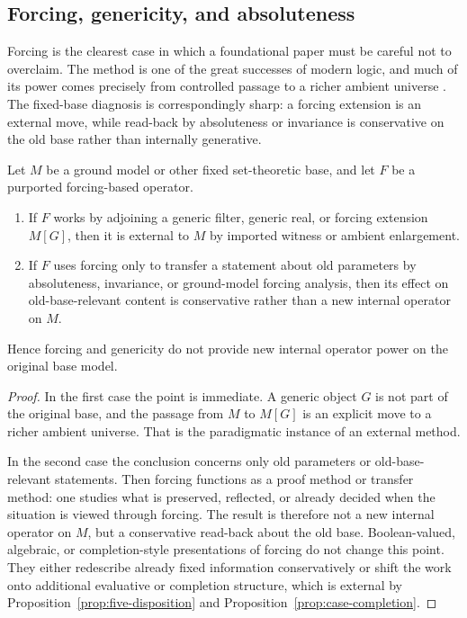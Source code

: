 \subsection{Forcing, genericity, and absoluteness}

Forcing is the clearest case in which a foundational paper must be careful not to overclaim. The method is one of the great successes of modern logic, and much of its power comes precisely from controlled passage to a richer ambient universe \citep{Jech2003,Kanamori2008}. The fixed-base diagnosis is correspondingly sharp: a forcing extension is an external move, while read-back by absoluteness or invariance is conservative on the old base rather than internally generative.

\begin{proposition}\label{prop:case-forcing}
Let $M$ be a ground model or other fixed set-theoretic base, and let $F$ be a purported forcing-based operator.
\begin{enumerate}[label=(\alph*)]
    \item If $F$ works by adjoining a generic filter, generic real, or forcing extension $M[G]$, then it is external to $M$ by imported witness or ambient enlargement.
    \item If $F$ uses forcing only to transfer a statement about old parameters by absoluteness, invariance, or ground-model forcing analysis, then its effect on old-base-relevant content is conservative rather than a new internal operator on $M$.
\end{enumerate}
Hence forcing and genericity do not provide new internal operator power on the original base model.
\end{proposition}

\begin{proof}
In the first case the point is immediate. A generic object $G$ is not part of the original base, and the passage from $M$ to $M[G]$ is an explicit move to a richer ambient universe. That is the paradigmatic instance of an external method.

In the second case the conclusion concerns only old parameters or old-base-relevant statements. Then forcing functions as a proof method or transfer method: one studies what is preserved, reflected, or already decided when the situation is viewed through forcing. The result is therefore not a new internal operator on $M$, but a conservative read-back about the old base. Boolean-valued, algebraic, or completion-style presentations of forcing do not change this point. They either redescribe already fixed information conservatively or shift the work onto additional evaluative or completion structure, which is external by Proposition~\ref{prop:five-disposition} and Proposition~\ref{prop:case-completion}.
\end{proof}


